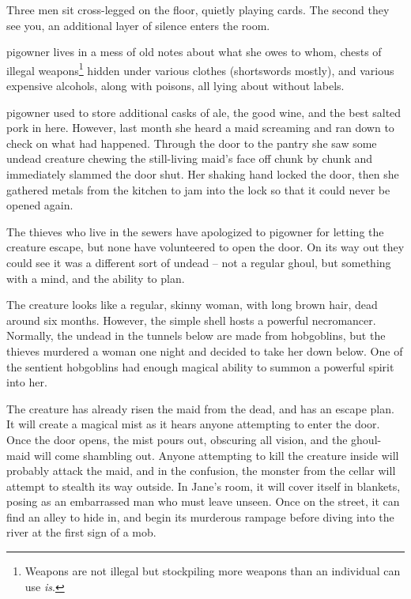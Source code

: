 \begin{multicols}{2}
\begin{boxtext}
	Three men sit cross-legged on the floor, quietly playing cards.
	The second they see you, an additional layer of silence enters the room.
\end{boxtext}


\humanthief


\Gls{pigowner} lives in a mess of old notes about what she owes to whom, chests of illegal weapons\footnote{Weapons are not illegal but stockpiling more weapons than an individual can use \emph{is}.} hidden under various clothes (shortswords mostly), and various expensive alcohols, along with poisons, all lying about without labels.


\Gls{pigowner} used to store additional casks of ale, the good wine, and the best salted pork in here.  However, last month she heard a maid screaming and ran down to check on what had happened.  Through the door to the pantry she saw some undead creature chewing the still-living maid's face off chunk by chunk and immediately slammed the door shut.  Her shaking hand locked the door, then she gathered metals from the kitchen to jam into the lock so that it could never be opened again.

The thieves who live in the sewers have apologized to \gls{pigowner} for letting the creature escape, but none have volunteered to open the door.
On its way out they could see it was a different sort of undead -- not a regular ghoul, but something with a mind, and the ability to plan.

The creature looks like a regular, skinny woman, with long brown hair, dead around six months.  However, the simple shell hosts a powerful necromancer.  Normally, the undead in the tunnels below are made from hobgoblins, but the thieves murdered a woman one night and decided to take her down below.  One of the sentient hobgoblins had enough magical ability to summon a powerful spirit into her.

\vfill\null



The creature has already risen the maid from the dead, and has an escape plan.
It will create a magical mist as it hears anyone attempting to enter the door.
Once the door opens, the mist pours out, obscuring all vision, and the ghoul-maid will come shambling out.
Anyone attempting to kill the creature inside will probably attack the maid, and in the confusion, the monster from the cellar will attempt to stealth its way outside.
In Jane's room, it will cover itself in blankets, posing as an embarrassed man who must leave unseen.
Once on the street, it can find an alley to hide in, and begin its murderous rampage before diving into the river at the first sign of a mob.


\end{multicols}
